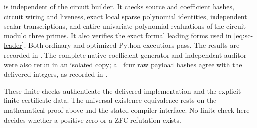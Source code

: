  is independent of the circuit builder.  It checks source
and coefficient hashes, circuit wiring and liveness, exact local sparse
polynomial identities, independent scalar transcriptions, and entire
univariate polynomial evaluations of the circuit modulo three primes.
It also verifies the exact formal leading forms used in
\eqref{eq:sc-leader}.  Both ordinary and optimized Python executions pass.
The results are recorded in .  The complete native
coefficient generator and independent auditor were also rerun in an
isolated copy; all four raw payload hashes agree with the delivered
integers, as recorded in .

These finite checks authenticate the delivered implementation and the
explicit finite certificate data.  The universal existence equivalence
rests on the mathematical proof above and the stated compiler interface.
No finite check here decides whether a positive zero or a ZFC refutation
exists.
